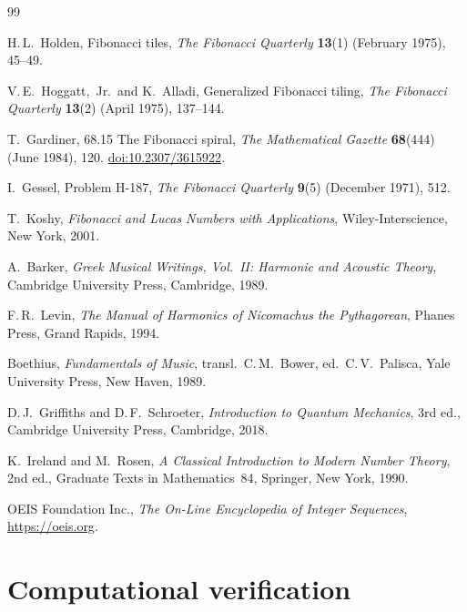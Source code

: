 \documentclass[11pt,a4paper]{article}
\theoremstyle{plain}
\theoremstyle{definition}
\theoremstyle{remark}
\begin{document}
\begin{thebibliography}{99}

H.\,L.~Holden, Fibonacci tiles, \emph{The Fibonacci Quarterly} \textbf{13}(1) (February 1975), 45--49.

V.\,E.~Hoggatt,~Jr.\ and K.~Alladi, Generalized Fibonacci tiling, \emph{The Fibonacci Quarterly} \textbf{13}(2) (April 1975), 137--144.

T.~Gardiner, 68.15 The Fibonacci spiral, \emph{The Mathematical Gazette} \textbf{68}(444) (June 1984), 120. \href{https://doi.org/10.2307/3615922}{doi:10.2307/3615922}.

I.~Gessel, Problem H-187, \emph{The Fibonacci Quarterly} \textbf{9}(5) (December 1971), 512.

T.~Koshy, \emph{Fibonacci and Lucas Numbers with Applications}, Wiley-Interscience, New York, 2001.

A.~Barker, \emph{Greek Musical Writings, Vol.~II: Harmonic and Acoustic Theory}, Cambridge University Press, Cambridge, 1989.

F.\,R.~Levin, \emph{The Manual of Harmonics of Nicomachus the Pythagorean}, Phanes Press, Grand Rapids, 1994.

Boethius, \emph{Fundamentals of Music}, transl.\ C.\,M.~Bower, ed.\ C.\,V.~Palisca, Yale University Press, New Haven, 1989.

D.\,J.~Griffiths and D.\,F.~Schroeter, \emph{Introduction to Quantum Mechanics}, 3rd ed., Cambridge University Press, Cambridge, 2018.

K.~Ireland and M.~Rosen, \emph{A Classical Introduction to Modern Number Theory}, 2nd ed., Graduate Texts in Mathematics~84, Springer, New York, 1990.

OEIS Foundation Inc., \emph{The On-Line Encyclopedia of Integer Sequences}, \url{https://oeis.org}.

\end{thebibliography}

\appendix
\section{Computational verification}\label{app:verify}
\end{document}
